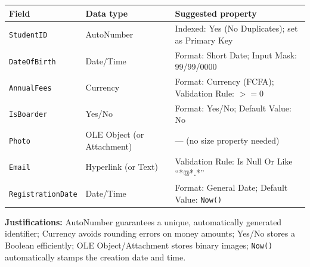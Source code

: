 \documentclass[11pt]{article}
\begin{document}
\begin{corrige}
\begin{center}
\begin{tabularx}{\linewidth}{|l|l|X|}
\hline
\rowcolor{popblueL} \textbf{Field} & \textbf{Data type} & \textbf{Suggested property} \\
\hline
\texttt{StudentID} & AutoNumber & Indexed: Yes (No Duplicates); set as Primary Key \\
\hline
\texttt{DateOfBirth} & Date/Time & Format: Short Date; Input Mask: 99/99/0000 \\
\hline
\texttt{AnnualFees} & Currency & Format: Currency (FCFA); Validation Rule: $>=0$ \\
\hline
\texttt{IsBoarder} & Yes/No & Format: Yes/No; Default Value: No \\
\hline
\texttt{Photo} & OLE Object (or Attachment) & --- (no size property needed) \\
\hline
\texttt{Email} & Hyperlink (or Text) & Validation Rule: Is Null Or Like ``*@*.*'' \\
\hline
\texttt{RegistrationDate} & Date/Time & Format: General Date; Default Value: \texttt{Now()} \\
\hline
\end{tabularx}
\end{center}
\textbf{Justifications:} AutoNumber guarantees a unique, automatically generated identifier; Currency avoids rounding errors on money amounts; Yes/No stores a Boolean efficiently; OLE Object/Attachment stores binary images; \texttt{Now()} automatically stamps the creation date and time.
\end{corrige}
\end{document}
